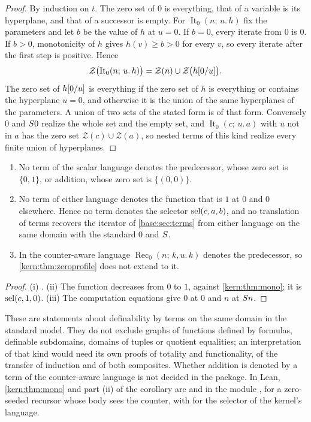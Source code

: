 \begin{proof}
By induction on $t$.  The zero set of $0$ is everything, that of a variable
is its hyperplane, and that of a successor is empty.  For
$\operatorname{It}_0(n;\,u.\,h)$ fix the parameters and let $b$ be the value
of $h$ at $u=0$.  If $b=0$, every iterate from $0$ is $0$.  If $b>0$,
monotonicity of $h$ gives $h(v)\ge b>0$ for every $v$, so every iterate
after the first step is positive.  Hence
\[
 \mathcal{Z}\bigl(\operatorname{It}_0(n;\,u.\,h)\bigr)
 =\mathcal{Z}(n)\cup\mathcal{Z}\bigl(h[0/u]\bigr).
\]
The zero set of $h[0/u]$ is everything if the zero set of $h$ is
everything or contains the hyperplane $u=0$, and otherwise it is the union
of the same hyperplanes of the parameters.  A union of two sets of the
stated form is of that form.  Conversely $0$ and $S 0$ realize the whole
set and the empty set, and $\operatorname{It}_0(c;\,u.\,a)$ with $u$ not in
$a$ has the zero set $\mathcal{Z}(c)\cup\mathcal{Z}(a)$, so nested terms of
this kind realize every finite union of hyperplanes.
\end{proof}

\begin{corollary}
\label{kern:cor:zeroseed}
\begin{enumerate}[label=\textup{(\roman*)}]
\item No term of the scalar language denotes the predecessor, whose zero set
 is $\{0,1\}$, or addition, whose zero set is $\{(0,0)\}$.
\item No term of either language denotes the function that is $1$ at $0$
 and $0$ elsewhere.  Hence no term denotes the selector $\operatorname{sel}(c,a,b)$, and
 no translation of terms recovers the iterator of \cref{base:sec:terms}
 from either language on the same domain with the standard $0$ and $S$.
\item In the counter-aware language
 $\operatorname{Rec}_0(n;\,k,u.\,k)$ denotes the predecessor, so
 \cref{kern:thm:zeroprofile} does not extend to it.
\end{enumerate}
\end{corollary}

\begin{proof}
(i) .  (ii) The function decreases from $0$ to
$1$, against \cref{kern:thm:mono}; it is $\operatorname{sel}(c,1,0)$.  (iii) The
computation equations give $0$ at $0$ and $n$ at $S n$.
\end{proof}

These are statements about definability by terms on the same domain in the
standard model.  They do not exclude graphs of functions defined by
formulas, definable subdomains, domains of tuples or quotient equalities;
an interpretation of that kind would need its own proofs of totality and
functionality, of the transfer of induction and of both composites.  Whether
addition is denoted by a term of the counter-aware language is not decided
in the package.  In Lean, \cref{kern:thm:mono} and part (ii) of the
corollary are  and  in the module
, for a zero-seeded recursor whose body sees the
counter, with  for the selector of the kernel's language.

